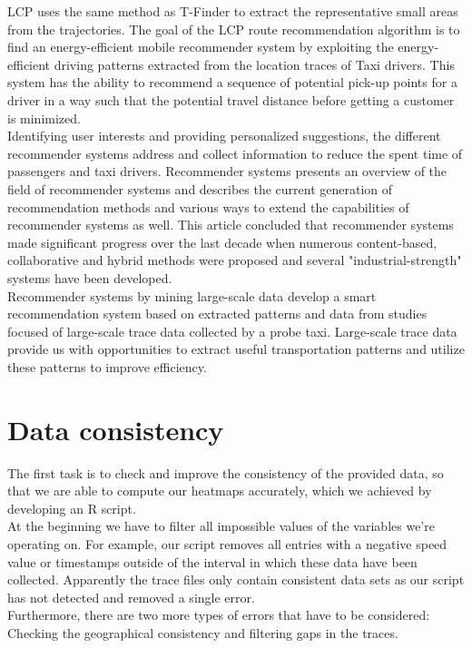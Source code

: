 \documentclass[11pt,conference,a4paper,twocolumns,romanappendices]{IEEEtran}
\begin{document}
LCP \cite{eff} uses the same method as T-Finder \cite{tf} to extract the representative small areas from the trajectories. The goal of the LCP route recommendation algorithm is to find an energy-efficient mobile recommender system by exploiting the energy-efficient driving patterns extracted from the location traces of Taxi drivers. This system has the ability to recommend a sequence of potential pick-up points for a driver in a way such that the potential travel distance before getting a customer is minimized. \\
Identifying user interests and providing personalized suggestions, the different recommender systems address and collect information to reduce the spent time of passengers and taxi drivers. Recommender systems \cite{tow} presents an overview of the field of recommender systems and describes the current generation of recommendation methods and various ways to extend the capabilities of recommender systems as well. This article concluded that recommender systems made significant progress over the last decade when numerous content-based, collaborative and hybrid methods were proposed and several "industrial-strength" systems have been developed. \\
Recommender systems by mining large-scale \cite{min1,min2} data develop a smart recommendation system based on extracted patterns and data from studies focused of large-scale trace data collected by a probe taxi. Large-scale trace data provide us with opportunities to extract useful transportation patterns and utilize these patterns to improve efficiency.
\label{sec:relatedWork}

\section{Data consistency}
The first task is to check and improve the consistency of the provided data, so that we are able to compute our heatmaps accurately, which we achieved by developing an R script.\\
At the beginning we have to filter all impossible values of the variables we're operating on. For example, our script removes all entries with a negative speed value or timestamps outside of the interval in which these data have been collected.  Apparently the trace files only contain consistent data sets as our script has not detected and removed a single error. \\
Furthermore, there are two more types of errors that have to be considered: Checking the geographical consistency and filtering gaps in the traces.
\end{document}
